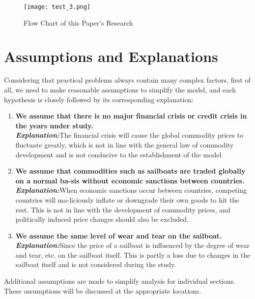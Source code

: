 \begin{figure}[htbp]  %
\centering  %
\texttt{[image: test\_3.png]} %
\caption{Flow Chart of this Paper's Research} %
\end{figure}
\vspace{-1cm}

\section{Assumptions and Explanations}
Considering that practical problems always contain many complex factors, first of all, we need to make reasonable assumptions to simplify the model, and each hypothesis is closely followed by its corresponding explanation:
\begin{enumerate}
	\item \textbf{We assume that there is no major financial crisis or credit crisis in the years under study.}\\
	\textbf{\textit{Explanation:}}The financial crisis will cause the global commodity prices to fluctuate greatly, which is not in line with the general law of commodity development and is not conducive to the establishment of the model.
	\item \textbf{We assume that commodities such as sailboats are traded globally on a normal ba-sis without economic sanctions between countries.}\\
	\textbf{\textit{Explanation:}}When economic sanctions occur between countries, competing countries will ma-liciously inflate or downgrade their own goods to hit the rest. This is not in line with the development of commodity prices, and politically induced price changes should also be excluded.
	\item \textbf{We assume the same level of wear and tear on the sailboat.}\\
	\textbf{\textit{Explanation:}}Since the price of a sailboat is influenced by the degree of wear and tear, etc. on the sailboat itself. This is partly a loss due to changes in the sailboat itself and is not considered during the study.
	\end{enumerate}
Additional assumptions are made to simplify analysis for individual sections. These assumptions will be discussed at the appropriate locations.

